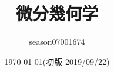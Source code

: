 \documentclass{jsarticle}
\title{微分幾何学}
\author{season07001674}
\date{\today(初版 2019/09/22)}
\renewcommand{\(}{\left(}
\renewcommand{\)}{\right)}
\renewcommand{\<}{\langle}
\renewcommand{\>}{\rangle}
\begin{document}
\maketitle
\tableofcontents





\nocite{*}


\end{document}
